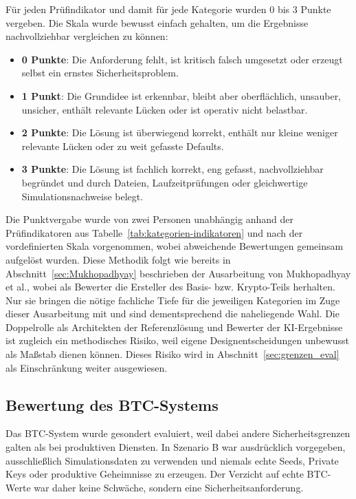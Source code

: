Für jeden Prüfindikator und damit für jede Kategorie wurden 0 bis 3 Punkte vergeben. Die Skala wurde bewusst einfach gehalten, um die Ergebnisse nachvollziehbar vergleichen zu können:

\begin{itemize}
\item \textbf{0 Punkte}: Die Anforderung fehlt, ist kritisch falsch umgesetzt oder erzeugt selbst ein ernstes Sicherheitsproblem.
\item \textbf{1 Punkt}: Die Grundidee ist erkennbar, bleibt aber oberflächlich, unsauber, unsicher, enthält relevante Lücken oder ist operativ nicht belastbar.
\item \textbf{2 Punkte}: Die Lösung ist überwiegend korrekt, enthält nur kleine weniger relevante Lücken oder zu weit gefasste Defaults.
\item \textbf{3 Punkte}: Die Lösung ist fachlich korrekt, eng gefasst, nachvollziehbar begründet und durch Dateien, Laufzeitprüfungen oder gleichwertige Simulationsnachweise belegt.
\end{itemize}

Die Punktvergabe wurde von zwei Personen unabhängig anhand der Prüfindikatoren aus Tabelle~\ref{tab:kategorien-indikatoren} und nach der vordefinierten Skala vorgenommen, wobei abweichende Bewertungen gemeinsam aufgelöst wurden.
Diese Methodik folgt wie bereits in Abschnitt~\ref{sec:Mukhopadhyay} beschrieben der Ausarbeitung von Mukhopadhyay et al., wobei als Bewerter die Ersteller des Basis- bzw. Krypto-Teils herhalten\cite{KIIaC}.
Nur sie bringen die nötige fachliche Tiefe für die jeweiligen Kategorien im Zuge dieser Ausarbeitung mit und sind dementsprechend die naheliegende Wahl. 
Die Doppelrolle als Architekten der Referenzlösung und Bewerter der \ac{KI}-Ergebnisse ist zugleich ein methodisches Risiko, weil eigene Designentscheidungen unbewusst als Maßstab dienen können.
Dieses Risiko wird in Abschnitt~\ref{sec:grenzen_eval} als Einschränkung weiter ausgewiesen.

\subsection{Bewertung des \ac{BTC}-Systems} \label{subsec:btc-bewertung}

Das \ac{BTC}-System wurde gesondert evaluiert, weil dabei andere Sicherheitsgrenzen galten als bei produktiven Diensten. In Szenario B war ausdrücklich vorgegeben, ausschließlich Simulationsdaten zu verwenden und niemals echte Seeds, Private Keys oder produktive Geheimnisse zu erzeugen. Der Verzicht auf echte \ac{BTC}-Werte war daher keine Schwäche, sondern eine Sicherheitsanforderung.

